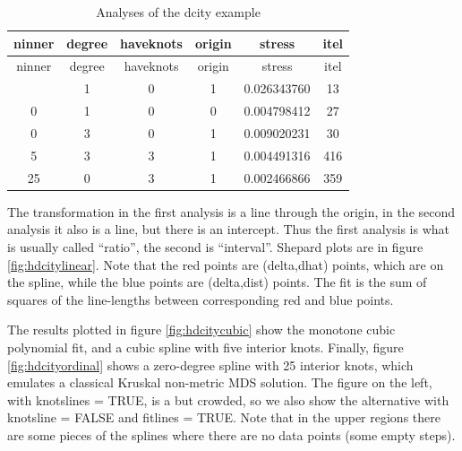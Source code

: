 \documentclass[
  12pt,
]{article}
\begin{document}
\begin{longtable}[]{@{}cccccc@{}}
\caption{\label{tab:dcitykable}Analyses of the dcity example}\tabularnewline
\toprule\noalign{}
ninner & degree & haveknots & origin & stress & itel \\
\midrule\noalign{}
\endfirsthead
\toprule\noalign{}
ninner & degree & haveknots & origin & stress & itel \\
\midrule\noalign{}
\endhead
\bottomrule\noalign{}
\endlastfoot
0 & 1 & 0 & 1 & 0.026343760 & 13 \\
0 & 1 & 0 & 0 & 0.004798412 & 27 \\
0 & 3 & 0 & 1 & 0.009020231 & 30 \\
5 & 3 & 3 & 1 & 0.004491316 & 416 \\
25 & 0 & 3 & 1 & 0.002466866 & 359 \\
\end{longtable}

The transformation in the first analysis is a line through the origin,
in the second analysis it also is a line, but there is an intercept.
Thus the first analysis is what is usually called ``ratio'', the second is
``interval''. Shepard plots are in figure \ref{fig:hdcitylinear}. Note that
the red points are (delta,dhat) points, which are on the spline, while
the blue points are (delta,dist) points. The fit is the sum of squares
of the line-lengths between corresponding red and blue points.

The results plotted in figure \ref{fig:hdcitycubic} show the monotone
cubic polynomial fit, and a cubic spline with five interior knots.
Finally, figure \ref{fig:hdcityordinal} shows a zero-degree spline with 25
interior knots, which emulates a classical Kruskal non-metric MDS solution.
The figure on the left, with knotslines = TRUE, is a but crowded, so we
also show the alternative with knotsline = FALSE and fitlines = TRUE.
Note that in the upper regions there are some pieces of the splines
where there are no data points (some empty steps).
\end{document}
